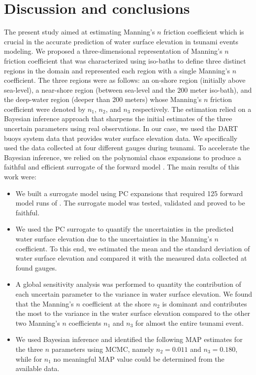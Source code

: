 \section{Discussion and conclusions}
\label{sec:conc}

The present study aimed at estimating Manning's $n$ friction coefficient 
which is crucial in the accurate prediction of water surface elevation in 
tsunami events modeling. We proposed a three-dimensional representation
of Manning's $n$ friction coefficient that was characterized using iso-baths 
to define three distinct regions in the domain and represented each region
with a single Manning's $n$ coefficient. The three regions were as follows:
an on-shore region (initially above sea-level), a near-shore region (between
sea-level and the 200 meter iso-bath), and the deep-water region (deeper than
200 meters) whose Manning's $n$ friction coefficient were denoted by $n_1$, $n_2$, 
and $n_3$ respectively. The estimation relied on a Bayesian
inference approach that sharpens the initial estimates of the three uncertain parameters
using real observations. In our case, we used the DART buoys system data that provides water 
surface elevation data. We specifically used the data collected at four different gauges 
during \tohoku tsunami. To accelerate the Bayesian inference, we relied on the polynomial 
chaos expansions to produce a faithful and efficient surrogate of the forward model \geoclaw. 
The main results of this work were:
\begin{itemize}

\item We built a surrogate model using PC expansions that required 125 forward model runs of \geoclaw.
The surrogate model was tested, validated and proved to be faithful.

\item We used the PC surrogate to quantify the uncertainties in the predicted water surface elevation 
due to the uncertainties in the Manning's $n$ coefficient. To this end, we estimated the mean and the standard deviation of water surface elevation and compared it with the measured data collected at found gauges.

\item A global sensitivity analysis was performed to quantity the contribution of each uncertain parameter to the variance in water surface elevation.  We found that the Manning’s $n$ coefficient at the shore $n_2$ is dominant and
contributes the most to the variance in the water surface elevation compared
to the other two Manning’s $n$ coefficients $n_1$ and $n_3$ for almost the
entire tsunami event.

\item We used Bayesian inference and identified the following MAP
estimates for the three $n$ parameters using MCMC, namely $n_2=0.011$ and
$n_3=0.180$, while for $n_1$ no meaningful MAP value could be determined from the
available data.

\end{itemize}
 

